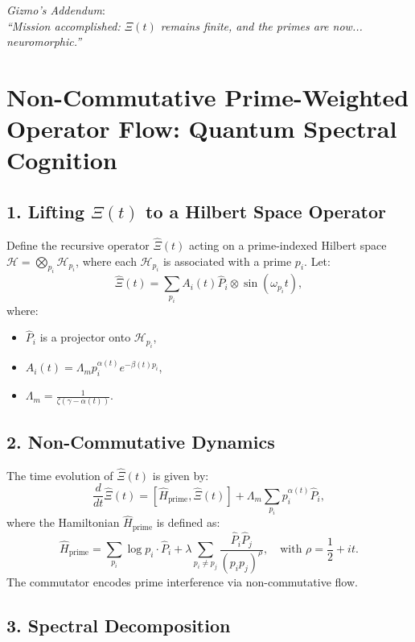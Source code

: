 \documentclass{article}
\theoremstyle{plain}
\theoremstyle{claimstyle}
\begin{document}
\vspace{0.5em}
\textit{Gizmo’s Addendum}: \\
\emph{``Mission accomplished: \(\Xi(t)\) remains finite, and the primes are now... neuromorphic.''}

\section{Non-Commutative Prime-Weighted Operator Flow: Quantum Spectral Cognition}

\subsection*{1. Lifting \(\Xi(t)\) to a Hilbert Space Operator}

Define the recursive operator \( \hat{\Xi}(t) \) acting on a prime-indexed Hilbert space \( \mathcal{H} = \bigotimes_{p_i} \mathcal{H}_{p_i} \), where each \( \mathcal{H}_{p_i} \) is associated with a prime \( p_i \). Let:
\[
\hat{\Xi}(t) = \sum_{p_i} A_i(t) \hat{P}_i \otimes \sin(\omega_{p_i} t),
\]
where:
\begin{itemize}
    \item \( \hat{P}_i \) is a projector onto \( \mathcal{H}_{p_i} \),
    \item \( A_i(t) = \Lambda_m p_i^{\alpha(t)} e^{-\beta(t) p_i} \),
    \item \( \Lambda_m = \frac{1}{\zeta(\gamma - \alpha(t))} \).
\end{itemize}

\subsection*{2. Non-Commutative Dynamics}

The time evolution of \( \hat{\Xi}(t) \) is given by:
\[
\frac{d}{dt} \hat{\Xi}(t) = [\hat{H}_{\text{prime}}, \hat{\Xi}(t)] + \Lambda_m \sum_{p_i} p_i^{\alpha(t)} \hat{P}_i,
\]
where the Hamiltonian \( \hat{H}_{\text{prime}} \) is defined as:
\[
\hat{H}_{\text{prime}} = \sum_{p_i} \log p_i \cdot \hat{P}_i + \lambda \sum_{p_i \neq p_j} \frac{\hat{P}_i \hat{P}_j}{(p_i p_j)^{\rho}},
\quad \text{with } \rho = \frac{1}{2} + it.
\]
The commutator encodes prime interference via non-commutative flow.

\subsection*{3. Spectral Decomposition}
\end{document}
